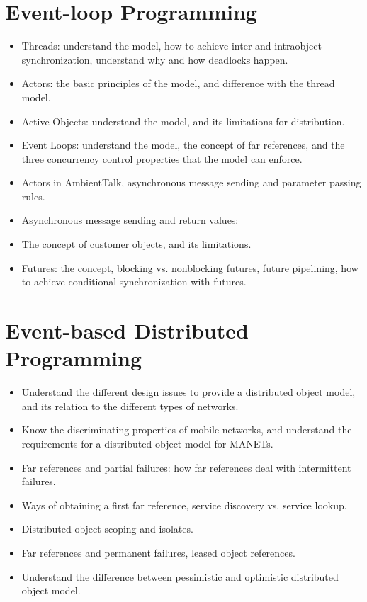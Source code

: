 \documentclass[a4paper]{report}
\begin{document}
\chapter{Event-loop Programming}
\begin{itemize}
\item Threads: understand the model, how to achieve inter and intraobject synchronization,
understand why and how deadlocks happen.
\item Actors: the basic principles of the model, and difference with the thread model.
\item Active Objects: understand the model, and its limitations for distribution.
\item Event Loops: understand the model, the concept of far references, and the three
concurrency control properties that the model can enforce.
\item Actors in AmbientTalk, asynchronous message sending and parameter passing rules.
\item Asynchronous message sending and return values:
\item The concept of customer objects, and its limitations.
\item Futures: the concept, blocking vs. nonblocking futures, future pipelining, how to
achieve conditional synchronization with futures.
\end{itemize}
\chapter{Event-based Distributed Programming}
\begin{itemize}
\item Understand the different design issues to provide a distributed object model, and its
relation to the different types of networks.
\item Know the discriminating properties of mobile networks, and understand the
requirements for a distributed object model for MANETs.
\item Far references and partial failures: how far references deal with intermittent failures.
\item Ways of obtaining a first far reference, service discovery vs. service lookup.
\item Distributed object scoping and isolates.
\item Far references and permanent failures, leased object references.
\item Understand the difference between pessimistic and optimistic distributed object model.
\end{itemize}
\end{document}
